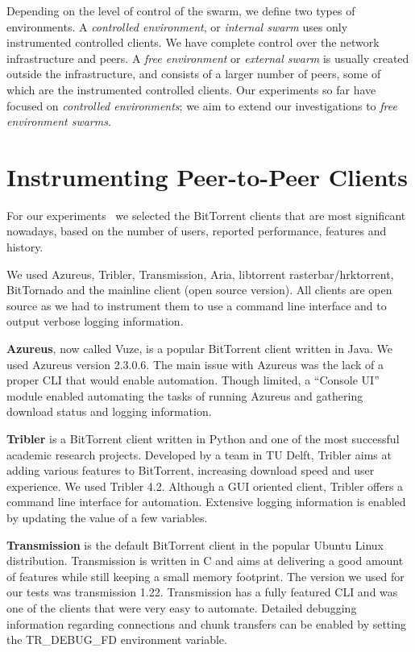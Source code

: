Depending on the level of control of the swarm, we define two types of
environments. A \textit{controlled environment}, or \textit{internal swarm}
uses only instrumented controlled clients. We have complete control over the
network infrastructure and peers. A \textit{free environment} or
\textit{external swarm} is usually created outside the infrastructure, and
consists of a larger number of peers, some of which are the instrumented
controlled clients. Our experiments so far have focused on \textit{controlled
environments}; we aim to extend our investigations to \textit{free environment
swarms}.

\section{Instrumenting Peer-to-Peer Clients}
\label{sec:deploy-instr}

For our experiments~\cite{bt-pef} we selected the BitTorrent clients that are most
significant nowadays, based on the number of users, reported performance,
features and history.

We used Azureus, Tribler, Transmission, Aria, libtorrent rasterbar/hrktorrent,
BitTornado and the mainline client (open source version). All clients are open
source as we had to instrument them to use a command line interface and to
output verbose logging information.

\textbf{Azureus}, now called Vuze, is a popular BitTorrent client written in
Java. We used Azureus version 2.3.0.6. The main issue with Azureus was the
lack of a proper CLI that would enable automation. Though limited, a ``Console
UI'' module enabled automating the tasks of running Azureus and gathering
download status and logging information.

\textbf{Tribler} is a BitTorrent client written in Python and one of the most
successful academic research projects. Developed by a team in TU Delft,
Tribler aims at adding various features to BitTorrent, increasing download
speed and user experience. We used Tribler 4.2. Although a GUI oriented
client, Tribler offers a command line interface for automation. Extensive
logging information is enabled by updating the value of a few variables.

\textbf{Transmission} is the default BitTorrent client in the popular Ubuntu
Linux distribution. Transmission is written in C and aims at delivering a good
amount of features while still keeping a small memory footprint. The version
we used for our tests was transmission 1.22. Transmission has a fully
featured CLI and was one of the clients that were very easy to automate.
Detailed debugging information regarding connections and chunk transfers can
be enabled by setting the TR\_DEBUG\_FD environment variable.

